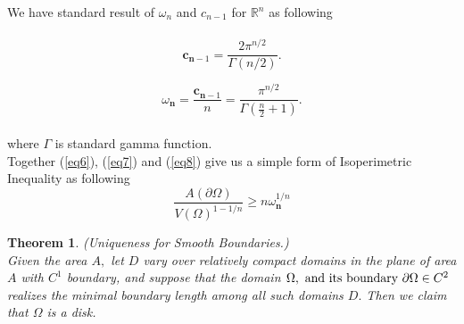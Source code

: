\documentclass[oneside]{book}
\newtheorem{theorem}{Theorem}[section]
\begin{document}
	We have standard result of $\omega_{n}$ and $c_{n-1}$ for $\mathbb{R}^{n}$ as following  \\\\
	\begin{equation}
	\label{eq7}  
	\mathbf{c}_{\mathbf{n}-1} = \frac{2 \pi^{n / 2}}{\Gamma(n / 2)}.
	\end{equation}
	
	
	
	\begin{equation}
	\label{eq8}  
	\omega_{\mathbf{n} } = \frac{\mathbf{c}_{\mathbf{n}-1}}{n} =\frac{\pi^{n / 2}}{\Gamma\left(\frac{n}{2}+1\right)}.
	\end{equation} \\
	where $\Gamma$ is standard gamma function.\\
	Together (\ref{eq6}),
	(\ref{eq7}) and (\ref{eq8}) give us a simple form of Isoperimetric Inequality as following\\
	\begin{equation}
	\label{eq9}  
	\frac{A(\partial \Omega)}{V(\Omega)^{1-1 / n}} \geq n \omega_{\mathbf{n}}^{1 / n}
	\end{equation}
	
	
	
	
	
	
	\begin{theorem}
		{(Uniqueness for Smooth Boundaries.)}
		\label{t:1} \\
		Given
		the area $A,$ let $D$ vary over relatively compact domains in the plane of area $A$
		with $C^{1}$ boundary, and suppose that the domain $\Omega, \text{ and its boundary } \\
		\partial \Omega \in C^{2}$ realizes the minimal
		boundary length among all such domains $D .$ Then we claim that $\Omega$ is a disk.
	\end{theorem}
	
\end{document}
